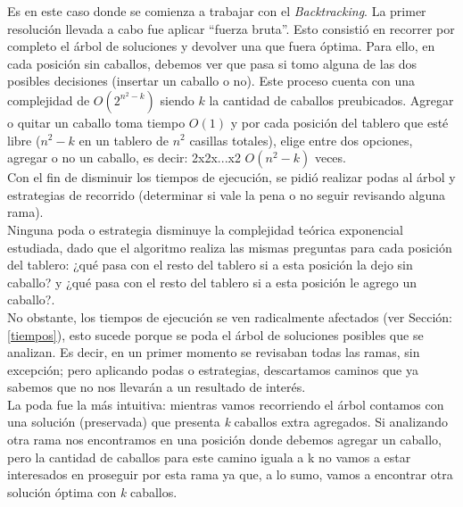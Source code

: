 Es en este caso donde se comienza a trabajar con el \emph{Backtracking}. La primer resoluci\'on llevada a cabo fue aplicar ``fuerza bruta''. Esto consisti\'o en recorrer por completo el \'arbol de soluciones y devolver una que fuera \'optima. Para ello, en cada posici\'on sin caballos, debemos ver que pasa si tomo alguna de las dos posibles decisiones (insertar un caballo o no). Este proceso cuenta con una complejidad de $O(2^{n^{2} - k})$ siendo $k$ la cantidad de caballos preubicados. Agregar o quitar un caballo toma tiempo $O(1)$ y por cada posici\'on del tablero que est\'e libre ($n^{2} - k$ en un tablero de  $n^{2}$ casillas totales), elige entre dos opciones, agregar o no un caballo, es decir: 2x2x...x2 $O(n^{2}-k)$ veces.\\

Con el fin de disminuir los tiempos de ejecuci\'on, se pidi\'o realizar podas al \'arbol y estrategias de recorrido (determinar si vale la pena o no seguir revisando alguna rama).\\

Ninguna poda o estrategia disminuye la complejidad te\'orica exponencial estudiada, dado que el algoritmo realiza las mismas preguntas para cada posici\'on del tablero: ¿qu\'e pasa con el resto del tablero si a esta posici\'on la dejo sin caballo? y ¿qu\'e pasa con el resto del tablero si a esta posici\'on le agrego un caballo?.\\

No obstante, los tiempos de ejecuci\'on se ven radicalmente afectados (ver Secci\'on: \ref{tiempos}), esto sucede porque se poda el \'arbol de soluciones posibles que se analizan. Es decir, en un primer momento se revisaban todas las ramas, sin excepci\'on; pero aplicando podas o estrategias, descartamos caminos que ya sabemos que no nos llevar\'an a un resultado de inter\'es.\\


La poda fue la m\'as intuitiva: mientras vamos recorriendo el \'arbol contamos con una soluci\'on (preservada) que presenta \emph{k} caballos extra agregados. Si analizando otra rama nos encontramos en una posici\'on donde debemos agregar un caballo, pero la cantidad de caballos para este camino iguala a k no vamos a estar interesados en proseguir por esta rama ya que, a lo sumo, vamos a encontrar otra soluci\'on \'optima con \emph{k} caballos.\\


